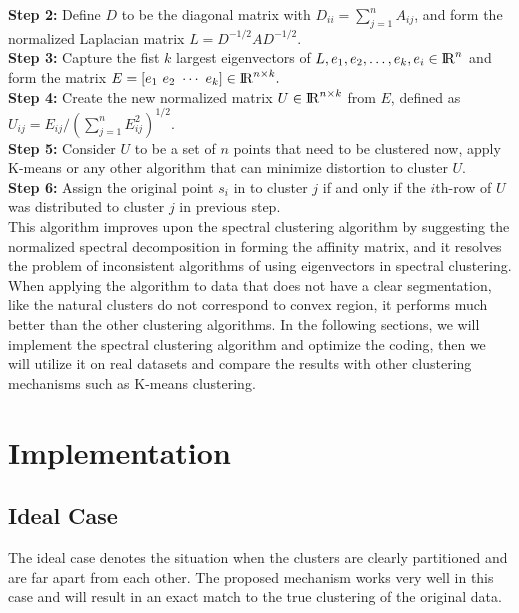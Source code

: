 \documentclass[11pt]{article}
\begin{document}
\textbf{Step 2:} Define $D$ to be the diagonal matrix with $D_{ii} =\sum_{j=1}^{n} A _{ij}$, and form the normalized Laplacian matrix $L = D^{-1/2}AD^{-1/2}$.\\

\textbf{Step 3:} Capture the fist $k$ largest eigenvectors of $L, e_1, e_2,  \ldots, e_k, e_i \in {\rm I\!R}^{n} $ and form the matrix $E = [e_1 ~e_2 ~\cdots ~e_k ] \in  {\rm I\!R}^{n\times k}.$\\

\textbf{Step 4:} Create the new normalized matrix $U \in {\rm I\!R}^{n\times k}$ from $E$, defined as $U_{ij}= E_{ij}/(\sum_{j=1}^{n}E_{ij}^2)^{1/2}$. \\

\textbf{Step 5:} Consider $U$ to be a set of $n$   points that need to be clustered now, apply K-means or any other algorithm that can minimize distortion to cluster $U$. \\

\textbf{Step 6:}  Assign the original point $s_i$ in to cluster $j$ if and only if the $i$th-row of $U$ was distributed to cluster $j$  in previous step.       \\

This algorithm improves upon the spectral clustering algorithm by suggesting the normalized spectral decomposition in forming the affinity matrix, and it resolves the problem of inconsistent algorithms of using eigenvectors in spectral clustering. When applying the algorithm to data that does not have a clear segmentation, like the natural clusters do not correspond to convex region, it performs much better than the other clustering algorithms. In the following sections, we will implement the spectral clustering algorithm and optimize the coding, then we will utilize it on real datasets and compare the results with other clustering mechanisms such as K-means clustering.



\section{Implementation}
\subsection{Ideal Case}
The ideal case denotes the situation when the clusters are clearly partitioned and are far apart from each other. The proposed mechanism works very well in this case and will result in an exact match to the true clustering of the original data.
\end{document}
